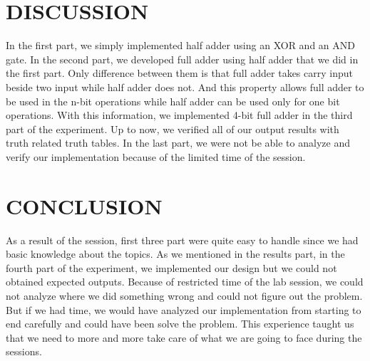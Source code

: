 \documentclass[pdftex,12pt,a4paper]{article}
\begin{document}
\section{DISCUSSION}
In the first part, we simply implemented half adder using an XOR and an AND gate. In the second part, we developed full adder using half adder that we did in the first part. Only difference between them is that full adder takes carry input beside two input while half adder does not. And this property allows full adder to be used in the n-bit operations while half adder can be used only for one bit operations. With this information, we implemented 4-bit full adder in the third part of the experiment. Up to now, we verified all of our output results with truth related truth tables. In the last part, we were not be able to analyze and verify our implementation because of the limited time of the session. 

\section{CONCLUSION}
As a result of the session, first three part were quite easy to handle since we had basic knowledge about the topics. As we mentioned in the results part, in the fourth part of the experiment, we implemented our design but we could not obtained expected outputs. Because of restricted time of the lab session, we could not analyze where we did something wrong and could not figure out the problem. But if we had time, we would have analyzed our implementation from starting to end carefully and could have been solve the problem. This experience taught us that we need to more and more take care of what we are going to face during the sessions.

\newpage
{}





\nocite{booklet}
\nocite{overleaf}
\nocite{sample}
\end{document}

